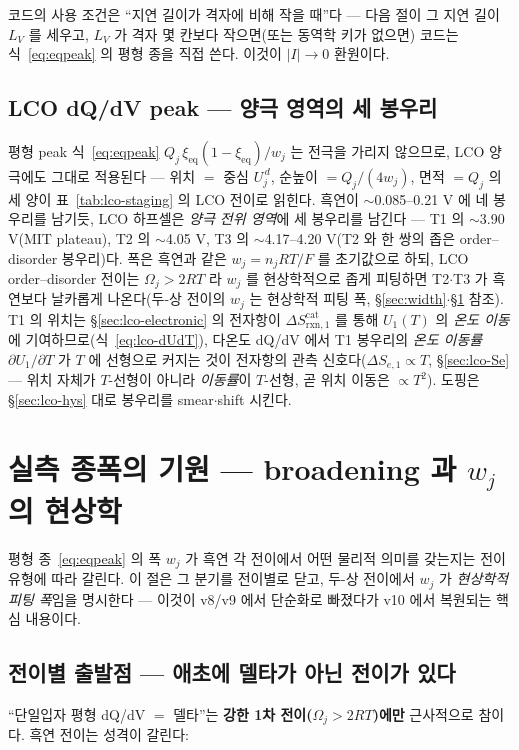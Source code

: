 \documentclass[11pt,a4paper]{article}
\newcommand{\eq}{\mathrm{eq}}
\newcommand{\rxn}{\mathrm{rxn}}
\begin{document}
코드의 사용 조건은 ``지연 길이가 격자에 비해 작을 때''다 — 다음 절이 그 지연 길이 $L_V$ 를 세우고, $L_V$ 가 격자
몇 칸보다 작으면(또는 동역학 키가 없으면) 코드는 식~\eqref{eq:eqpeak} 의 평형 종을 직접 쓴다. 이것이 $|I|\to0$ 환원이다.

\subsection{LCO dQ/dV peak — 양극 영역의 세 봉우리}\label{sec:lco-peak}
평형 peak 식~\eqref{eq:eqpeak} $Q_j\,\xi_\eq(1-\xi_\eq)/w_j$ 는 전극을 가리지 않으므로, LCO 양극에도 그대로 적용된다 —
위치 $=$ 중심 $U_j^{\,d}$, 순높이 $=Q_j/(4w_j)$, 면적 $=Q_j$ 의 세 양이 표~\ref{tab:lco-staging} 의 LCO 전이로 읽힌다.
흑연이 $\sim$0.085--0.21 V 에 네 봉우리를 남기듯, LCO 하프셀은 \emph{양극 전위 영역}에 세 봉우리를 남긴다 — T1 의
$\sim$3.90 V(MIT plateau), T2 의 $\sim$4.05 V, T3 의 $\sim$4.17--4.20 V(T2 와 한 쌍의 좁은 order--disorder 봉우리)다.
폭은 흑연과 같은 $w_j=n_jRT/F$ 를 초기값으로 하되, LCO order--disorder 전이는 $\Omega_j>2RT$ 라
$w_j$ 를 현상학적으로 좁게 피팅하면 T2$\cdot$T3 가 흑연보다 날카롭게 나온다(두-상 전이의 $w_j$
는 현상학적 피팅 폭, \S\ref{sec:width}$\cdot$\S\ref{sec:broadening} 참조). T1 의 위치는 \S\ref{sec:lco-electronic} 의 전자항이
$\Delta S_{\rxn,1}^\mathrm{cat}$ 를 통해 $U_1(T)$ 의 \emph{온도 이동}에 기여하므로(식~\eqref{eq:lco-dUdT}), 다온도
dQ/dV 에서 T1 봉우리의 \emph{온도 이동률} $\partial U_1/\partial T$ 가 $T$ 에 선형으로 커지는 것이 전자항의 관측
신호다($\Delta S_{e,1}\propto T$, \S\ref{sec:lco-Se} — 위치 자체가 $T$-선형이 아니라 \emph{이동률}이 $T$-선형, 곧 위치
이동은 $\propto T^2$). 도핑은 \S\ref{sec:lco-hys} 대로 봉우리를 smear$\cdot$shift 시킨다.

\section{실측 종폭의 기원 — broadening 과 $w_j$ 의 현상학}\label{sec:broadening}
평형 종~\eqref{eq:eqpeak} 의 폭 $w_j$ 가 흑연 각 전이에서 어떤 물리적 의미를 갖는지는 전이 유형에 따라 갈린다.
이 절은 그 분기를 전이별로 닫고, 두-상 전이에서 $w_j$ 가 \emph{현상학적 피팅 폭}임을 명시한다 — 이것이 v8/v9 에서
단순화로 빠졌다가 v10 에서 복원되는 핵심 내용이다.

\subsection{전이별 출발점 — 애초에 델타가 아닌 전이가 있다}\label{sec:broadening-type}
``단일입자 평형 dQ/dV $=$ 델타''는 \textbf{강한 1차 전이($\Omega_j>2RT$)에만} 근사적으로 참이다. 흑연 전이는
성격이 갈린다:
\end{document}
